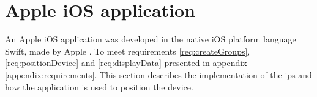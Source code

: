 \section{Apple iOS application}\label{sec:implApp}
An Apple iOS application was developed in the native iOS platform language Swift, made by Apple \cite{SwiftOrg}.
To meet requirements \ref{req:createGroups}, \ref{req:positionDevice} and \ref{req:displayData} presented in appendix \ref{appendix:requirements}.
This section describes the implementation of the \acrshort{ips} and how the application is used to position the device.



% 

